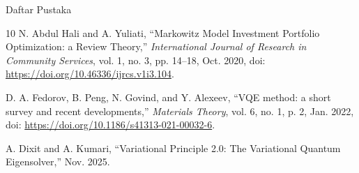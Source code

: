 \documentclass[aspectratio=169,xcolor=pdftex,dvipsnames,table]{beamer}
\begin{document}
\begin{frame}[allowframebreaks]{Daftar Pustaka}
    \begin{thebibliography}{10}
        N. Abdul Hali and A. Yuliati, ``Markowitz Model Investment Portfolio Optimization: a Review Theory,'' \textit{International Journal of Research in Community Services}, vol. 1, no. 3, pp. 14--18, Oct. 2020, doi: \url{https://doi.org/10.46336/ijrcs.v1i3.104}.
        
        D. A. Fedorov, B. Peng, N. Govind, and Y. Alexeev, ``VQE method: a short survey and recent developments,'' \textit{Materials Theory}, vol. 6, no. 1, p. 2, Jan. 2022, doi: \url{https://doi.org/10.1186/s41313-021-00032-6}.
        
        A. Dixit and A. Kumari, ``Variational Principle 2.0: The Variational Quantum Eigensolver,'' Nov. 2025.
    \end{thebibliography}
\end{frame}
\end{document}
